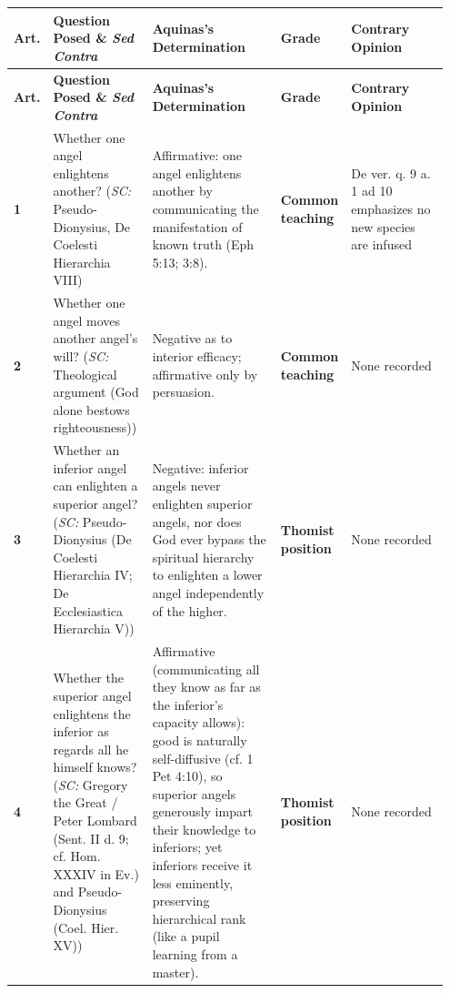 {\scriptsize
\setlength{\tabcolsep}{2.5pt}
\renewcommand{\arraystretch}{1.15}
\begin{longtable}{>{\raggedright\arraybackslash}p{0.05\linewidth}>{\raggedright\arraybackslash}p{0.23\linewidth}>{\raggedright\arraybackslash}p{0.31\linewidth}>{\raggedright\arraybackslash}p{0.12\linewidth}>{\raggedright\arraybackslash}p{0.24\linewidth}}
\toprule
\textbf{Art.} & \textbf{Question Posed \& \emph{Sed Contra}} & \textbf{Aquinas's Determination} & \textbf{Grade} & \textbf{Contrary Opinion} \\
\midrule
\endfirsthead
\toprule
\textbf{Art.} & \textbf{Question Posed \& \emph{Sed Contra}} & \textbf{Aquinas's Determination} & \textbf{Grade} & \textbf{Contrary Opinion} \\
\midrule
\endhead
\bottomrule
\endfoot
\textbf{1} & Whether one angel enlightens another? (\emph{SC:} Pseudo-Dionysius, De Coelesti Hierarchia VIII) & Affirmative: one angel enlightens another by communicating the manifestation of known truth (Eph 5:13; 3:8). & \textbf{Common teaching} & De ver. q. 9 a. 1 ad 10 emphasizes no new species are infused \\
\addlinespace[1.5pt]
\textbf{2} & Whether one angel moves another angel's will? (\emph{SC:} Theological argument (God alone bestows righteousness)) & Negative as to interior efficacy; affirmative only by persuasion. & \textbf{Common teaching} & None recorded \\
\addlinespace[1.5pt]
\textbf{3} & Whether an inferior angel can enlighten a superior angel? (\emph{SC:} Pseudo-Dionysius (De Coelesti Hierarchia IV; De Ecclesiastica Hierarchia V)) & Negative: inferior angels never enlighten superior angels, nor does God ever bypass the spiritual hierarchy to enlighten a lower angel independently of the higher. & \textbf{Thomist position} & None recorded \\
\addlinespace[1.5pt]
\textbf{4} & Whether the superior angel enlightens the inferior as regards all he himself knows? (\emph{SC:} Gregory the Great / Peter Lombard (Sent. II d. 9; cf. Hom. XXXIV in Ev.) and Pseudo-Dionysius (Coel. Hier. XV)) & Affirmative (communicating all they know as far as the inferior's capacity allows): good is naturally self-diffusive (cf. 1 Pet 4:10), so superior angels generously impart their knowledge to inferiors; yet inferiors receive it less eminently, preserving hierarchical rank (like a pupil learning from a master). & \textbf{Thomist position} & None recorded \\
\end{longtable}
}

